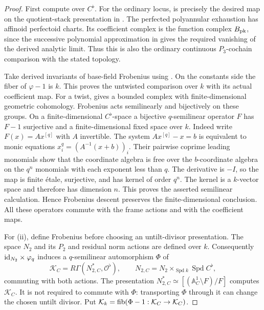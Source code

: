 \begin{proof}
First compute over $C^\flat$.  For the ordinary locus,
 is precisely the desired
map on the quotient-stack presentation in
.  The perfected polyannular
exhaustion has affinoid perfectoid charts.  Its coefficient
complex is the function complex $B_{\mathrm{pk}}$, since the
successive polynomial approximation in
 gives the required vanishing
of the derived analytic limit.  Thus this is also the
ordinary continuous $P_3$-cochain comparison with the
stated topology.

Take derived invariants of base-field Frobenius using
.  On the constants side the
fiber of $\varphi-1$ is $k$.  This proves the untwisted
comparison over $k$ with its actual coefficient map.
For a twist,  gives a bounded
complex with finite-dimensional geometric cohomology.
Frobenius acts semilinearly and bijectively on these
groups.  On a finite-dimensional $C^\flat$-space a
bijective $q$-semilinear operator $F$ has $F-1$
surjective and a finite-dimensional fixed space over
$k$.  Indeed write $F(x)=A x^{[q]}$ with $A$ invertible.
The system $A x^{[q]}-x=b$ is equivalent to monic
equations $x_i^q=(A^{-1}(x+b))_i$.  Their pairwise
coprime leading monomials show that the coordinate
algebra is free over the $b$-coordinate algebra on
the $q^n$ monomials with each exponent less than $q$.
The derivative is $-I$, so the map is finite \'etale,
surjective, and has kernel of order $q^n$.  The kernel
is a $k$-vector space and therefore has dimension $n$.
This proves the asserted semilinear calculation.
Hence Frobenius descent
preserves the finite-dimensional conclusion.  All
these operators commute with the frame actions and
with the coefficient maps.

For \textup{(ii)}, define Frobenius before choosing an
untilt-divisor presentation.  The space $N_2$ and its
$P_2$ and residual norm actions are defined over $k$.
Consequently $\mathrm{id}_{N_2}\times\varphi_q$ induces a
$q$-semilinear automorphism $\Phi$ of
\[
 \mathcal K_C=R\Gamma(N_{2,C}^*,\mathcal O^\flat),\qquad
 N_{2,C}=N_2\times_{\operatorname{Spd}k}
                       \operatorname{Spd}C^\flat,
\]
commuting with both actions.  The presentation
$N_{2,C}^*\simeq[(\mathbb A_C^1\setminus F)/F]$ computes
$\mathcal K_C$.  It is not required to commute with
$\Phi$: transporting $\Phi$ through it can change the
chosen untilt divisor.  Put
$\mathcal K_k=\operatorname{fib}(\Phi-1:\mathcal K_C\to\mathcal K_C)$.


\end{proof}

